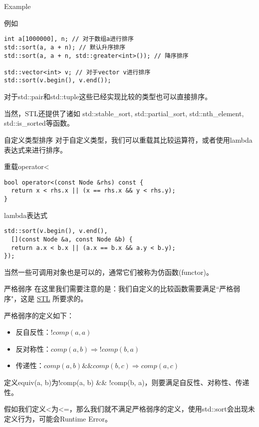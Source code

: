 \documentclass{ldr-simple-gray}
\begin{document}
  \begin{frame}[fragile]{Example}
    \begin{block}{例如}
      \begin{verbatim}
int a[1000000], n; // 对于数组a进行排序
std::sort(a, a + n); // 默认升序排序
std::sort(a, a + n, std::greater<int>()); // 降序排序

std::vector<int> v; // 对于vector v进行排序
std::sort(v.begin(), v.end());\end{verbatim}
    \end{block}
    对于std::pair和std::tuple这些已经实现比较的类型也可以直接排序。
    \newline

    当然，STL还提供了诸如 std::stable\_sort, std::partial\_sort, std::nth\_element, std::is\_sorted等函数。
  \end{frame}

  \begin{frame}[fragile]{自定义类型排序}
    对于自定义类型，我们可以重载其比较运算符，或者使用lambda表达式来进行排序。
    \begin{block}{重载operator<}
      \begin{verbatim}
bool operator<(const Node &rhs) const {
  return x < rhs.x || (x == rhs.x && y < rhs.y);
}\end{verbatim}
    \end{block}
    \begin{block}{lambda表达式}
      \begin{verbatim}
std::sort(v.begin(), v.end(),
  [](const Node &a, const Node &b) {
  return a.x < b.x || (a.x == b.x && a.y < b.y);
});\end{verbatim}
    \end{block}
    
    当然一些可调用对象也是可以的，通常它们被称为仿函数(functor)。
  \end{frame}

  \begin{frame}{严格弱序}
    在这里我们需要注意的是：我们自定义的比较函数需要满足``严格弱序"，这是 \href{https://zh.cppreference.com/w/cpp/named_req/Compare}{STL} 所要求的。\newline

    严格弱序的定义如下：
    \begin{itemize}
      \item 反自反性：$!comp(a, a)$
      \item 反对称性：$comp(a, b) \Rightarrow !comp(b, a)$
      \item 传递性：$comp(a, b) \&\& comp(b, c) \Rightarrow comp(a, c)$
    \end{itemize}
    定义equiv(a, b)为!comp(a, b) \&\& !comp(b, a)，则要满足自反性、对称性、传递性。\newline

    假如我们定义<为<=，那么我们就不满足严格弱序的定义，使用std::sort会出现未定义行为，可能会Runtime Error。
  \end{frame}
\end{document}
